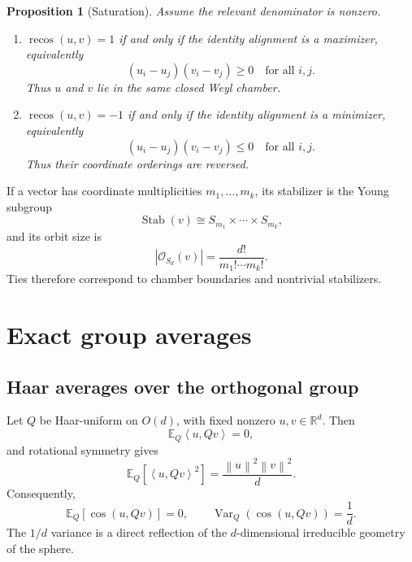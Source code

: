 \documentclass[11pt,a4paper]{article}
\newtheorem{proposition}{Proposition}
\newcommand{\R}{\mathbb{R}}
\newcommand{\Sd}{S_d}
\newcommand{\Od}{O(d)}
\newcommand{\ip}[2]{\left\langle #1,#2\right\rangle}
\newcommand{\norm}[1]{\left\lVert #1\right\rVert}
\newcommand{\E}{\mathbb{E}}
\newcommand{\Var}{\operatorname{Var}}
\newcommand{\recos}{\operatorname{recos}}
\newcommand{\cosim}{\operatorname{cos}}
\begin{document}
\begin{proposition}[Saturation]
Assume the relevant denominator is nonzero.
\begin{enumerate}[label=(\roman*)]
    \item $\recos(u,v)=1$ if and only if the identity alignment is a maximizer, equivalently
    \begin{equation}
        (u_i-u_j)(v_i-v_j)\geq 0
        \quad\text{for all }i,j.
    \end{equation}
    Thus $u$ and $v$ lie in the same closed Weyl chamber.
    \item $\recos(u,v)=-1$ if and only if the identity alignment is a minimizer, equivalently
    \begin{equation}
        (u_i-u_j)(v_i-v_j)\leq 0
        \quad\text{for all }i,j.
    \end{equation}
    Thus their coordinate orderings are reversed.
\end{enumerate}
\end{proposition}

If a vector has coordinate multiplicities $m_1,\ldots,m_k$, its stabilizer is the Young subgroup
\begin{equation}
    \operatorname{Stab}(v)\cong S_{m_1}\times\cdots\times S_{m_k},
\end{equation}
and its orbit size is
\begin{equation}
    |\mathcal{O}_{\Sd}(v)|
    =\frac{d!}{m_1!\cdots m_k!}.
\end{equation}
Ties therefore correspond to chamber boundaries and nontrivial stabilizers.

\section{Exact group averages}

\subsection{Haar averages over the orthogonal group}

Let $Q$ be Haar-uniform on $\Od$, with fixed nonzero $u,v\in\R^d$. Then
\begin{equation}
    \E_Q\ip{u}{Qv}=0,
\end{equation}
and rotational symmetry gives
\begin{equation}
    \E_Q\left[\ip{u}{Qv}^2\right]
    =\frac{\norm{u}^2\norm{v}^2}{d}.
\end{equation}
Consequently,
\begin{equation}
    \E_Q\left[\cosim(u,Qv)\right]=0,
    \qquad
    \Var_Q\left(\cosim(u,Qv)\right)=\frac{1}{d}.
\end{equation}
The $1/d$ variance is a direct reflection of the $d$-dimensional irreducible geometry of the sphere.
\end{document}
